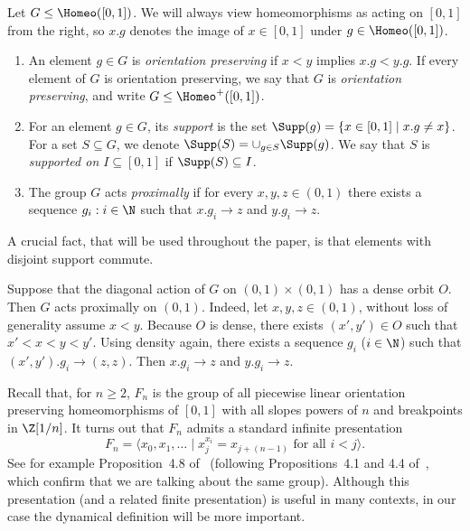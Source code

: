 \begin{defi}
\label{def:dynamical}

Let $G \leq \Homeo([0, 1])$. We will always view homeomorphisms as acting on $[0,1]$ from the right, so $x.g$ denotes the image of $x\in [0,1]$ under $g\in\Homeo([0,1])$.
\begin{enumerate}
\item An element $g \in G$ is \emph{orientation preserving} if $x < y$ implies $x.g < y.g$. If every element of $G$ is orientation preserving, we say that $G$ is \emph{orientation preserving}, and write $G \leq \Homeo^+([0, 1])$.
\item For an element $g \in G$, its \emph{support} is the set $\Supp(g) = \{ x \in [0, 1] \mid x.g \neq x \}$. For a set $S \subseteq G$, we denote $\Supp(S) = \cup_{g \in S} \Supp(g)$. We say that $S$ is \emph{supported on $I \subseteq [0, 1]$} if $\Supp(S) \subseteq I$.
\item The group $G$ acts \emph{proximally} if for every $x, y, z \in (0, 1)$ there exists a sequence $g_i : i \in \N$ such that $x.g_i \to z$ and $y.g_i \to z$.
\end{enumerate}
\end{defi}

A crucial fact, that will be used throughout the paper, is that elements with disjoint support commute.

\begin{rema}
\label{rem:proximal}

Suppose that the diagonal action of $G$ on $(0, 1) \times (0, 1)$ has a dense orbit $O$. Then $G$ acts proximally on $(0, 1)$. Indeed, let $x, y, z \in (0, 1)$, without loss of generality assume $x < y$. Because $O$ is dense, there exists $(x', y') \in O$ such that $x' < x < y < y'$. Using density again, there exists a sequence $g_i$ ($i \in \N$) such that $(x', y').g_i \to (z, z)$. Then $x.g_i \to z$ and $y.g_i \to z$.
\end{rema}

Recall that, for $n\ge 2$, $F_n$ is the group of all piecewise linear orientation preserving homeomorphisms of $[0,1]$ with all slopes powers of $n$ and breakpoints in $\Z[1/n]$. It turns out that $F_n$ admits a standard infinite presentation
\[
F_n=\langle x_0,x_1,\dots\mid x_j^{x_i} = x_{j+(n-1)} \text{ for all } i<j\rangle \text{.}
\]
See for example Proposition~4.8 of~\cite{brown87} (following Propositions~4.1 and 4.4 of~\cite{brown87}, which confirm that we are talking about the same group). Although this presentation (and a related finite presentation) is useful in many contexts, in our case the dynamical definition will be more important.


